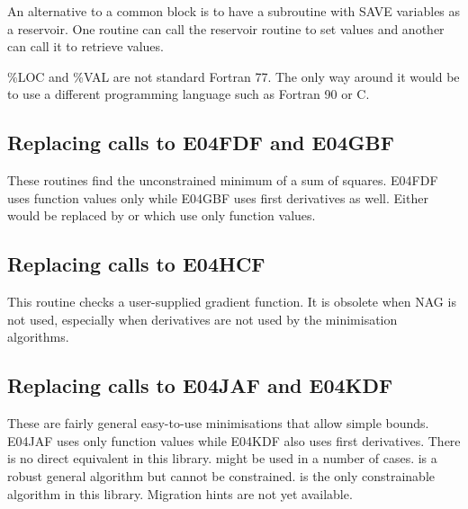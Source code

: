 \documentclass[11pt,twoside,nolof]{starlink}
\begin{document}
   An alternative to a common block is to have a subroutine with SAVE
   variables as a reservoir. One routine can call the reservoir routine
   to set values and another can call it to retrieve values.

   \%LOC and \%VAL are not standard Fortran 77. The only way around it
   would be to use a different programming language such as Fortran 90
   or C.


\subsection{Replacing calls to E04FDF and E04GBF}

   These routines find the unconstrained minimum of a sum of squares.
   E04FDF uses function values only while E04GBF uses first derivatives
   as well. Either would be replaced by
   or
   which use only function values.


\subsection{Replacing calls to E04HCF}

   This routine checks a user-supplied gradient function. It is obsolete
   when NAG is not used, especially when derivatives are not used by the
   minimisation algorithms.


\subsection{Replacing calls to E04JAF and E04KDF}

   These are fairly general easy-to-use minimisations that allow simple
   bounds. E04JAF uses only function values while E04KDF also uses first
   derivatives. There is no direct equivalent in this library.
   might
   be used in a number of cases.
   is a
   robust general algorithm but cannot be constrained.
   is the only constrainable algorithm in this library.
   Migration hints are not yet available.
\end{document}
